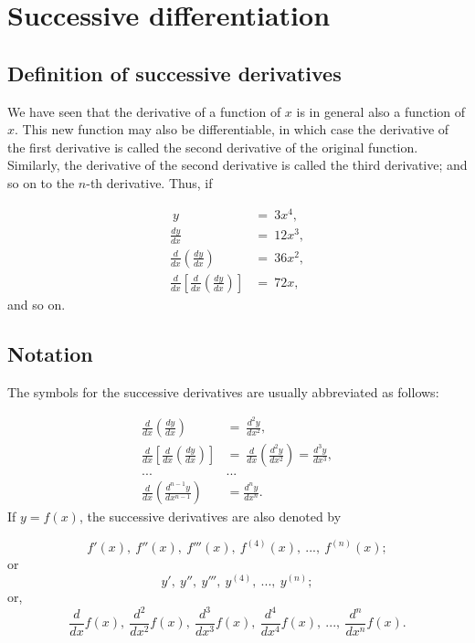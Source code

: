 
\chapter{Successive differentiation}

 
\section{Definition of successive derivatives}

We have seen that the derivative of a function of $x$ 
is in general also a function of $x$. This new function may 
also be differentiable, in which case the derivative of 
the first derivative is called the second derivative of 
the original function. Similarly, the derivative of the 
second derivative is called the third derivative; and 
so on to the $n$-th derivative. Thus, if

\[
\begin{array}{rl}
\ y 	&=\ 3x^4,\\
\frac{dy}{dx} 	&=\ 12x^3,\\
\frac{d}{dx} \left ( \frac{dy}{dx} \right ) 	&=\ 36x^2,\\
\frac{d}{dx} \left [ \frac{d}{dx} \left ( \frac{dy}{dx} \right ) \right ] 	
&=\ 72x,
\end{array}
\]
and so on.

\section{Notation}

The symbols for the successive derivatives are usually abbreviated as follows:

\[
\begin{array}{rl}
\frac{d}{dx} \left ( \frac{dy}{dx} \right ) 	&=\ \frac{d^2y}{dx^2},\\
\frac{d}{dx} \left [ \frac{d}{dx} \left ( \frac{dy}{dx} \right ) \right ] 	
&=\ \frac{d}{dx} \left ( \frac{d^2y}{dx^2} \right ) = \frac{d^3y}{dx^3},\\
. . . &	. . .\\
\frac{d}{dx} \left ( \frac{d^{n-1}y}{dx^{n-1}} \right )
 &	= \frac{d^ny}{dx^n}.
\end{array}
\]
If $y = f(x)$, the successive derivatives are also denoted by

\[
    f'(x),\ f''(x),\ f'''(x),\ f^{(4)}(x),\ ...,\ f^{(n)}(x);
\]
or
\[
    y',\ y'',\ y''',\ y^{(4)},\ ...,\ y^{(n)};
\]
or,
\[
\frac{d}{dx} f(x),\ \frac{d^2}{dx^2} f(x),
\ \frac{d^3}{dx^3} f(x),\ \frac{d^4}{dx^4} f(x),
\ ...,\ \frac{d^n}{dx^n} f(x). 
\]

